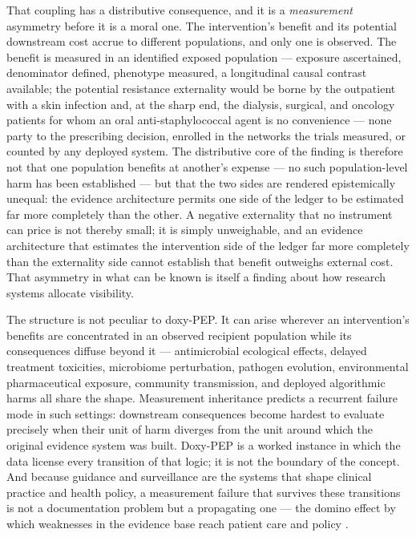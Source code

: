 \documentclass[10pt,letterpaper]{article}
\begin{document}
That coupling has a distributive consequence, and it is a
\emph{measurement} asymmetry before it is a moral one. The
intervention's benefit and its potential downstream cost accrue to different populations, and only one is observed. The benefit is measured
in an identified exposed population --- exposure ascertained,
denominator defined, phenotype measured, a longitudinal causal contrast
available; the potential resistance externality would be borne by the
outpatient with a skin infection and, at the sharp end, the dialysis,
surgical, and oncology patients for whom an oral anti-staphylococcal
agent is no convenience --- none party to the prescribing decision,
enrolled in the networks the trials measured, or counted by any deployed
system. The distributive core of the finding is therefore not that one
population benefits at another's expense --- no such population-level
harm has been established --- but that the two sides are rendered
epistemically unequal: the evidence architecture permits one side of the
ledger to be estimated far more completely than the other. A negative
externality that no instrument can price is not thereby small; it is
simply unweighable, and an evidence architecture that estimates the intervention side of the ledger far more completely than the externality side cannot establish that benefit outweighs external cost. That asymmetry in
what can be known is itself a finding about how research systems
allocate visibility.

The structure is not peculiar to doxy-PEP. It can arise wherever an
intervention's benefits are concentrated in an observed recipient
population while its consequences diffuse beyond it --- antimicrobial
ecological effects, delayed treatment toxicities, microbiome
perturbation, pathogen evolution, environmental pharmaceutical exposure,
community transmission, and deployed algorithmic harms all share the
shape. Measurement inheritance predicts a recurrent failure mode in such
settings: downstream consequences become hardest to evaluate precisely
when their unit of harm diverges from the unit around which the original
evidence system was built. Doxy-PEP is a worked instance in which the
data license every transition of that logic; it is not the boundary of the concept. And because guidance and surveillance are the systems that shape clinical practice and health policy, a measurement failure that survives these transitions is not a documentation problem but a propagating one --- the domino effect by which weaknesses in the evidence base reach patient care and policy \cite{armond2024integrity}.
\end{document}
